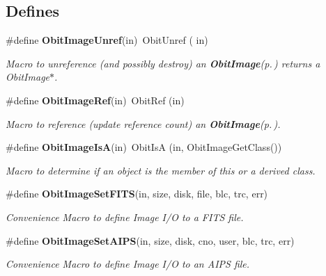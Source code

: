 \subsection*{Defines}
\begin{CompactItemize}
\item 
\#define {\bf Obit\-Image\-Unref}(in)\ Obit\-Unref ( in)
\begin{CompactList}\small\item\em Macro to unreference (and possibly destroy) an {\bf Obit\-Image}{\rm (p.\,\pageref{structObitImage})} returns a Obit\-Image$\ast$. \item\end{CompactList}\item 
\#define {\bf Obit\-Image\-Ref}(in)\ Obit\-Ref (in)
\begin{CompactList}\small\item\em Macro to reference (update reference count) an {\bf Obit\-Image}{\rm (p.\,\pageref{structObitImage})}. \item\end{CompactList}\item 
\#define {\bf Obit\-Image\-Is\-A}(in)\ Obit\-Is\-A (in, Obit\-Image\-Get\-Class())
\begin{CompactList}\small\item\em Macro to determine if an object is the member of this or a derived class. \item\end{CompactList}\item 
\#define {\bf Obit\-Image\-Set\-FITS}(in, size, disk, file, blc, trc, err)
\begin{CompactList}\small\item\em Convenience Macro to define Image I/O to a FITS file. \item\end{CompactList}\item 
\#define {\bf Obit\-Image\-Set\-AIPS}(in, size, disk, cno, user, blc, trc, err)
\begin{CompactList}\small\item\em Convenience Macro to define Image I/O to an AIPS file. \item\end{CompactList}\end{CompactItemize}
